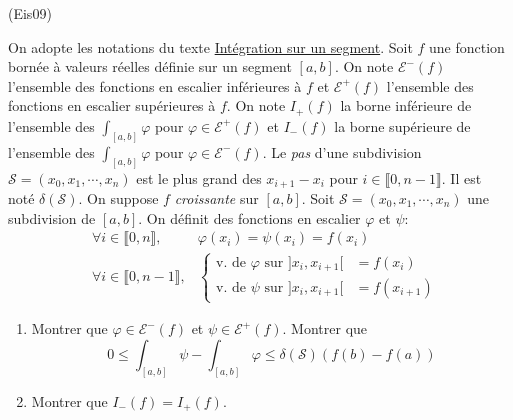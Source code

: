 \begin{tiny}(Eis09)\end{tiny} On adopte les notations du texte \href{http://maquisdoc.net/data/cours_nicolair/C2189.pdf}{Intégration sur un segment}.\newline
Soit $f$ une fonction bornée à valeurs réelles définie sur un segment $[a,b]$. On note $\mathcal{E}^-(f)$ l'ensemble des fonctions en escalier inférieures à $f$ et $\mathcal{E}^+(f)$ l'ensemble des fonctions en escalier supérieures à $f$. On note $I_+(f)$ la borne inférieure de l'ensemble des $\int_{[a,b]}\varphi$ pour $\varphi\in \mathcal{E}^+(f)$ et $I_-(f)$ la borne supérieure de l'ensemble des $\int_{[a,b]}\varphi$ pour $\varphi\in \mathcal{E}^-(f)$.\newline
Le \emph{pas} d'une subdivision $\mathcal{S} = (x_0,x_1,\cdots,x_n)$ est le plus grand des $x_{i+1}-x_i$ pour $i\in \llbracket0 , n-1\rrbracket$. Il est noté $\delta(\mathcal{S})$.\newline
On suppose $f$ \emph{croissante} sur $[a,b]$.\newline
Soit $\mathcal{S} = (x_0,x_1,\cdots,x_n)$ une subdivision de $[a,b]$. On définit des fonctions en escalier $\varphi$ et $\psi$:
\begin{align*}
 &\forall i \in \llbracket0 , n\rrbracket, &\varphi(x_i)=\psi(x_i)=f(x_i)\\
 &\forall i \in \llbracket0 , n-1\rrbracket, 
&\left\lbrace 
\begin{aligned}
 \text{v. de }\varphi \text{ sur }]x_i,x_{i+1}[&=f(x_i)\\
 \text{v. de }\psi \text{ sur }]x_i,x_{i+1}[&=f(x_{i+1})
\end{aligned}
\right. 
\end{align*}
\begin{enumerate}
 \item Montrer que $\varphi\in \mathcal{E}^-(f)$ et $\psi\in \mathcal{E}^+(f)$. Montrer que
\begin{displaymath}
 0\leq \int_{[a,b]}\psi -\int_{[a,b]}\varphi \leq \delta(\mathcal{S})(f(b)-f(a))  
\end{displaymath}
\item Montrer que $I_-(f)=I_+(f)$.
\end{enumerate}
